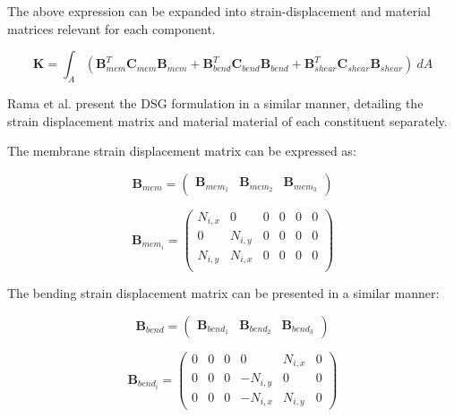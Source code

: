The above expression can be expanded into strain-displacement and material matrices relevant for each component.

\begin{equation} 
\mathbf{K} = \int_A  (\mathbf{B}_{mem}^T \mathbf{C}_{mem} \mathbf{B}_{mem} + \mathbf{B}_{bend}^T \mathbf{C}_{bend} \mathbf{B}_{bend} + \mathbf{B}_{shear}^T \mathbf{C}_{shear} \mathbf{B}_{shear})\ dA
\label{eqt5}
\end{equation}

Rama et al. \cite{Ram16} present the DSG formulation in a similar manner, detailing the strain displacement matrix and material material of each constituent separately.

The membrane strain displacement matrix can be expressed as:

\begin{equation} 
\mathbf{B}_{mem} =  \begin{pmatrix}
\mathbf{B}_{mem_1} & \mathbf{B}_{mem_2} & \mathbf{B}_{mem_3}
\end{pmatrix} 
\label{eqt6}
\end{equation}

\begin{equation} 
\mathbf{B}_{mem_i} =  \begin{pmatrix}
N_{i,x} & 0 & 0 & 0 & 0 & 0 \\
0 & N_{i,y} & 0 & 0 & 0 & 0 \\
N_{i,y} & N_{i,x} & 0 & 0 & 0 & 0 \\
\end{pmatrix} 
\label{eqt7}
\end{equation}

The bending strain displacement matrix can be presented in a similar manner:

\begin{equation} 
\mathbf{B}_{bend} =  \begin{pmatrix}
\mathbf{B}_{bend_1} & \mathbf{B}_{bend_2} & \mathbf{B}_{bend_3}
\end{pmatrix} 
\label{eqt8}
\end{equation}

\begin{equation} 
\mathbf{B}_{bend_i} =  \begin{pmatrix}
0 & 0 & 0 & 0 & N_{i,x} & 0 \\
0 & 0 & 0 & -N_{i,y} & 0 & 0 \\
0 & 0 & 0 & -N_{i,x} & N_{i,y} & 0
\end{pmatrix} 
\label{eqt9}
\end{equation}

